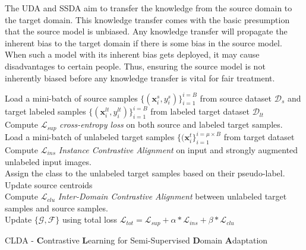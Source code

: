 The UDA and SSDA aim to transfer the knowledge from the source domain to the target domain. This knowledge transfer comes with the basic presumption that the source model is unbiased. Any knowledge transfer will propagate the inherent bias to the target domain if there is some bias in the source model. When such a model with its inherent bias gets deployed, it may cause disadvantages to certain people. Thus, ensuring the source model is not inherently biased before any knowledge transfer is vital for fair treatment.


\begin{algorithm}
\DontPrintSemicolon
{}

 {
    Load a mini-batch of source samples $\{(\mathbf{x}_{i}^{s}, y_{i}^{s})\}_{i=1}^{i=B}$ from source dataset ${\mathcal{D}_{s}}$ and target labeled samples $\{(\mathbf{x}_{i}^{lt}, y_{i}^{lt})\}_{i=1}^{i=B}$ from labeled target dataset ${\mathcal{D}_{lt}}$\\
    
    Compute $\mathcal{L}_{sup}$ \textit{cross-entropy loss} on both source and labeled target samples.\\
    
    Load a mini-batch of unlabeled target samples $\{(\mathbf{x}_{i}^{t}\}_{i=1}^{i=\mu \times B}$ from target dataset\\
    
    Compute $\mathcal{L}_{ins}$ \textit{Instance Contrastive Alignment} on input and strongly augmented unlabeled input images.\\ 
    
    Assign the class to the unlabeled target samples based on their pseudo-label.\\
    
    Update source centroids\\
    
    Compute $\mathcal{L}_{clu}$ \textit{Inter-Domain Contrastive Alignment} between unlabeled target samples and source samples.\\
    
    Update $\{\mathcal{G}, \mathcal{F}\}$ using total loss $\mathcal{L}_{tot}= \mathcal{L}_{sup}+ \alpha*\mathcal{L}_{ins} + \beta*\mathcal{L}_{clu}$\\
    
    }
\caption{CLDA - \textbf{C}ontrastive \textbf{L}earning for Semi-Supervised \textbf{D}omain \textbf{A}daptation}
\label{algo}
\end{algorithm}










